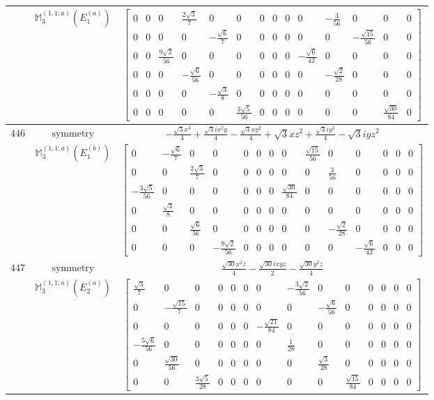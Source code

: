 \documentclass[fleqn,8pt,landscape]{jsarticle}
\begin{document}
\begin{longtable}{ccc}
$  $ & $ \mathbb{M}_{3}^{(1,1;a)}(E_{1}^{(a)}) $ & $ \begin{bmatrix} 0 & 0 & 0 & \frac{2 \sqrt{3}}{7} & 0 & 0 & 0 & 0 & 0 & 0 & - \frac{3}{56} & 0 & 0 & 0 \\ 0 & 0 & 0 & 0 & - \frac{\sqrt{6}}{7} & 0 & 0 & 0 & 0 & 0 & 0 & - \frac{\sqrt{15}}{56} & 0 & 0 \\ 0 & 0 & \frac{9 \sqrt{2}}{56} & 0 & 0 & 0 & 0 & 0 & 0 & - \frac{\sqrt{6}}{42} & 0 & 0 & 0 & 0 \\ 0 & 0 & 0 & - \frac{\sqrt{6}}{56} & 0 & 0 & 0 & 0 & 0 & 0 & - \frac{\sqrt{2}}{28} & 0 & 0 & 0 \\ 0 & 0 & 0 & 0 & - \frac{\sqrt{3}}{8} & 0 & 0 & 0 & 0 & 0 & 0 & 0 & 0 & 0 \\ 0 & 0 & 0 & 0 & 0 & \frac{3 \sqrt{5}}{56} & 0 & 0 & 0 & 0 & 0 & 0 & \frac{\sqrt{30}}{84} & 0 \end{bmatrix} $ \\ \hline
$ 446 $ & $ \text{symmetry} $ & $ - \frac{\sqrt{3} x^{3}}{4} + \frac{\sqrt{3} i x^{2} y}{4} - \frac{\sqrt{3} x y^{2}}{4} + \sqrt{3} x z^{2} + \frac{\sqrt{3} i y^{3}}{4} - \sqrt{3} i y z^{2} $ \\
$  $ & $ \mathbb{M}_{3}^{(1,1;a)}(E_{1}^{(b)}) $ & $ \begin{bmatrix} 0 & - \frac{\sqrt{6}}{7} & 0 & 0 & 0 & 0 & 0 & 0 & \frac{\sqrt{15}}{56} & 0 & 0 & 0 & 0 & 0 \\ 0 & 0 & \frac{2 \sqrt{3}}{7} & 0 & 0 & 0 & 0 & 0 & 0 & \frac{3}{56} & 0 & 0 & 0 & 0 \\ - \frac{3 \sqrt{5}}{56} & 0 & 0 & 0 & 0 & 0 & 0 & \frac{\sqrt{30}}{84} & 0 & 0 & 0 & 0 & 0 & 0 \\ 0 & \frac{\sqrt{3}}{8} & 0 & 0 & 0 & 0 & 0 & 0 & 0 & 0 & 0 & 0 & 0 & 0 \\ 0 & 0 & \frac{\sqrt{6}}{56} & 0 & 0 & 0 & 0 & 0 & 0 & - \frac{\sqrt{2}}{28} & 0 & 0 & 0 & 0 \\ 0 & 0 & 0 & - \frac{9 \sqrt{2}}{56} & 0 & 0 & 0 & 0 & 0 & 0 & - \frac{\sqrt{6}}{42} & 0 & 0 & 0 \end{bmatrix} $ \\ \hline
$ 447 $ & $ \text{symmetry} $ & $ \frac{\sqrt{30} x^{2} z}{4} - \frac{\sqrt{30} i x y z}{2} - \frac{\sqrt{30} y^{2} z}{4} $ \\
$  $ & $ \mathbb{M}_{3}^{(1,1;a)}(E_{2}^{(a)}) $ & $ \begin{bmatrix} \frac{\sqrt{3}}{7} & 0 & 0 & 0 & 0 & 0 & 0 & - \frac{3 \sqrt{2}}{56} & 0 & 0 & 0 & 0 & 0 & 0 \\ 0 & - \frac{\sqrt{15}}{7} & 0 & 0 & 0 & 0 & 0 & 0 & - \frac{\sqrt{6}}{56} & 0 & 0 & 0 & 0 & 0 \\ 0 & 0 & 0 & 0 & 0 & 0 & - \frac{\sqrt{21}}{84} & 0 & 0 & 0 & 0 & 0 & 0 & 0 \\ - \frac{5 \sqrt{6}}{56} & 0 & 0 & 0 & 0 & 0 & 0 & \frac{1}{28} & 0 & 0 & 0 & 0 & 0 & 0 \\ 0 & \frac{\sqrt{30}}{56} & 0 & 0 & 0 & 0 & 0 & 0 & \frac{\sqrt{3}}{28} & 0 & 0 & 0 & 0 & 0 \\ 0 & 0 & \frac{3 \sqrt{5}}{28} & 0 & 0 & 0 & 0 & 0 & 0 & \frac{\sqrt{15}}{84} & 0 & 0 & 0 & 0 \end{bmatrix} $ \\ \hline

\end{longtable}
\end{document}
